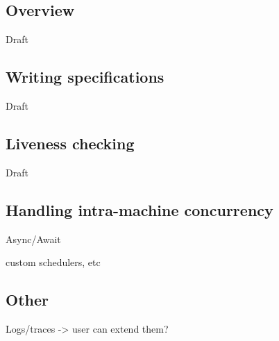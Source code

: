 \subsection{Overview}
\label{sec:psharp:overview}

Draft

\subsection{Writing specifications}
\label{sec:psharp:specs}

Draft

\subsection{Liveness checking}
\label{sec:psharp:liveness}

Draft

\subsection{Handling intra-machine concurrency}
\label{sec:psharp:async}

Async/Await

custom schedulers, etc

\subsection{Other}
\label{sec:psharp:other}

Logs/traces -> user can extend them?

